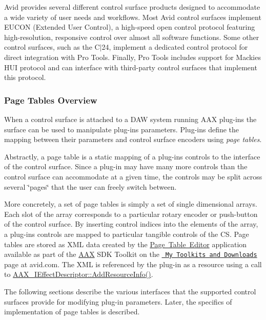 Avid provides several different control surface products designed to accommodate a wide variety of user needs and workflows. Most Avid control surfaces implement E\+U\+C\+ON (Extended User Control), a high-\/speed open control protocol featuring high-\/resolution, responsive control over almost all software functions. Some other control surfaces, such as the C$\vert$24, implement a dedicated control protocol for direct integration with Pro Tools. Finally, Pro Tools includes support for Mackie\textquotesingle{}s H\+UI protocol and can interface with third-\/party control surfaces that implement this protocol.

\hypertarget{a00833_subsection__page_tables_overview}{}\subsubsection{Page Tables Overview}\label{a00833_subsection__page_tables_overview}
When a control surface is attached to a D\+AW system running A\+AX plug-\/ins the surface can be used to manipulate plug-\/ins\textquotesingle{} parameters. Plug-\/ins define the mapping between their parameters and control surface encoders using {\itshape page tables}.

Abstractly, a page table is a static mapping of a plug-\/in\textquotesingle{}s controls to the interface of the control surface. Since a plug-\/in may have many more controls than the control surface can accommodate at a given time, the controls may be split across several \char`\"{}pages\char`\"{} that the user can freely switch between.

More concretely, a set of page tables is simply a set of single dimensional arrays. Each slot of the array corresponds to a particular rotary encoder or push-\/button of the control surface. By inserting control indices into the elements of the array, a plug-\/in\textquotesingle{}s controls are mapped to particular tangible controls of the CS. Page tables are stored as X\+ML data created by the \mbox{\hyperlink{a00833_subsection_creating_page_tables_in_pete}{Page Table Editor}} application available as part of the \mbox{\hyperlink{a00852}{A\+AX}} S\+DK Toolkit on the \href{https://my.avid.com/products/cppsdk}{\texttt{ My Toolkits and Downloads}} page at avid.\+com. The X\+ML is referenced by the plug-\/in as a resource using a call to \mbox{\hyperlink{a01813_a3326bd8e29690a352408539029a50a61}{A\+A\+X\+\_\+\+I\+Effect\+Descriptor\+::\+Add\+Resource\+Info()}}.

The following sections describe the various interfaces that the supported control surfaces provide for modifying plug-\/in parameters. Later, the specifics of implementation of page tables is described. 

